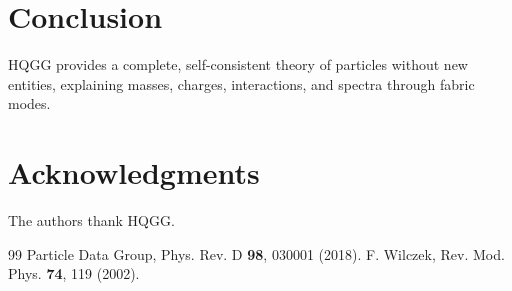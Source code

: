\documentclass[12pt,a4paper]{article}
\begin{document}
\section{Conclusion}

HQGG provides a complete, self-consistent theory of particles without new entities, explaining masses, charges, interactions, and spectra through fabric modes.

\begin{center}
\end{center}

\section*{Acknowledgments}

The authors thank HQGG.

\begin{thebibliography}{99}
 Particle Data Group, Phys. Rev. D \textbf{98}, 030001 (2018).
 F. Wilczek, Rev. Mod. Phys. \textbf{74}, 119 (2002).
\end{thebibliography}
\end{document}
